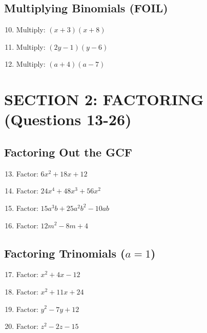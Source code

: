 \documentclass[12pt]{article}
\begin{document}
\subsection*{Multiplying Binomials (FOIL)}

\begin{enumerate}
\setcounter{enumi}{9}
\item Multiply: $(x + 3)(x + 8)$

\item Multiply: $(2y - 1)(y - 6)$

\item Multiply: $(a + 4)(a - 7)$
\end{enumerate}

\hrulefill

\section*{SECTION 2: FACTORING (Questions 13-26)}

\subsection*{Factoring Out the GCF}

\begin{enumerate}
\setcounter{enumi}{12}
\item Factor: $6x^2 + 18x + 12$

\item Factor: $24x^4 + 48x^3 + 56x^2$

\item Factor: $15a^3b + 25a^2b^2 - 10ab$

\item Factor: $12m^2 - 8m + 4$
\end{enumerate}

\subsection*{Factoring Trinomials ($a = 1$)}

\begin{enumerate}
\setcounter{enumi}{16}
\item Factor: $x^2 + 4x - 12$

\item Factor: $x^2 + 11x + 24$

\item Factor: $y^2 - 7y + 12$

\item Factor: $z^2 - 2z - 15$
\end{enumerate}
\end{document}
